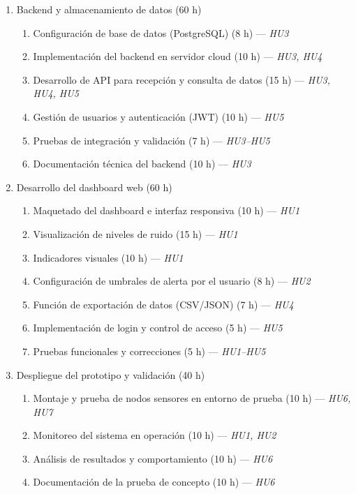 \documentclass[
11pt, %
]{charter}
\begin{document}
\begin{enumerate}
    \item Backend y almacenamiento de datos (60 h)
    \begin{enumerate}
        \item Configuración de base de datos (PostgreSQL) (8 h) — \textit{HU3}
        \item Implementación del backend en servidor cloud (10 h) — \textit{HU3, HU4}
        \item Desarrollo de API para recepción y consulta de datos (15 h) — \textit{HU3, HU4, HU5}
        \item Gestión de usuarios y autenticación (JWT) (10 h) — \textit{HU5}
        \item Pruebas de integración y validación (7 h) — \textit{HU3–HU5}
        \item Documentación técnica del backend (10 h) — \textit{HU3}
    \end{enumerate}

    \item Desarrollo del dashboard web (60 h)
    \begin{enumerate}
        \item Maquetado del dashboard e interfaz responsiva (10 h) — \textit{HU1}
        \item Visualización de niveles de ruido (15 h) — \textit{HU1}
        \item Indicadores visuales (10 h) — \textit{HU1}
        \item Configuración de umbrales de alerta por el usuario (8 h) — \textit{HU2}
        \item Función de exportación de datos (CSV/JSON) (7 h) — \textit{HU4}
        \item Implementación de login y control de acceso (5 h) — \textit{HU5}
        \item Pruebas funcionales y correcciones (5 h) — \textit{HU1–HU5}
    \end{enumerate}

    \item Despliegue del prototipo y validación (40 h)
    \begin{enumerate}
        \item Montaje y prueba de nodos sensores en entorno de prueba (10 h) — \textit{HU6, HU7}
        \item Monitoreo del sistema en operación (10 h) — \textit{HU1, HU2}
        \item Análisis de resultados y comportamiento (10 h) — \textit{HU6}
        \item Documentación de la prueba de concepto (10 h) — \textit{HU6}
    \end{enumerate}


\end{enumerate}
\end{document}
